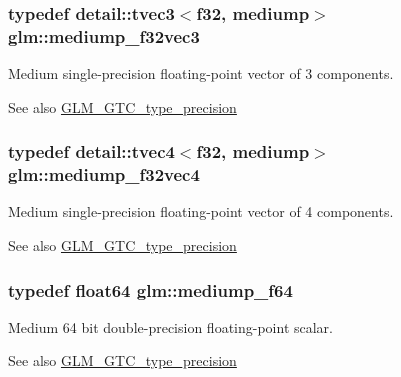 \subsubsection[{\texorpdfstring{mediump\+\_\+f32vec3}{mediump_f32vec3}}]{\setlength{\rightskip}{0pt plus 5cm}typedef detail\+::tvec3$<$f32, mediump$>$ {\bf glm\+::mediump\+\_\+f32vec3}}\hypertarget{group__gtc__type__precision_gada8879dd10f28428e2eb1ae62f643f65}{}\label{group__gtc__type__precision_gada8879dd10f28428e2eb1ae62f643f65}
Medium single-\/precision floating-\/point vector of 3 components. \begin{DoxySeeAlso}{See also}
\hyperlink{group__gtc__type__precision}{G\+L\+M\+\_\+\+G\+T\+C\+\_\+type\+\_\+precision} 
\end{DoxySeeAlso}
\subsubsection[{\texorpdfstring{mediump\+\_\+f32vec4}{mediump_f32vec4}}]{\setlength{\rightskip}{0pt plus 5cm}typedef detail\+::tvec4$<$f32, mediump$>$ {\bf glm\+::mediump\+\_\+f32vec4}}\hypertarget{group__gtc__type__precision_gaa5a1b058d185d87504591a11c6247518}{}\label{group__gtc__type__precision_gaa5a1b058d185d87504591a11c6247518}
Medium single-\/precision floating-\/point vector of 4 components. \begin{DoxySeeAlso}{See also}
\hyperlink{group__gtc__type__precision}{G\+L\+M\+\_\+\+G\+T\+C\+\_\+type\+\_\+precision} 
\end{DoxySeeAlso}
\subsubsection[{\texorpdfstring{mediump\+\_\+f64}{mediump_f64}}]{\setlength{\rightskip}{0pt plus 5cm}typedef float64 {\bf glm\+::mediump\+\_\+f64}}\hypertarget{group__gtc__type__precision_gabd273bd38ea5e013aeec9ffd2b2591fb}{}\label{group__gtc__type__precision_gabd273bd38ea5e013aeec9ffd2b2591fb}
Medium 64 bit double-\/precision floating-\/point scalar. \begin{DoxySeeAlso}{See also}
\hyperlink{group__gtc__type__precision}{G\+L\+M\+\_\+\+G\+T\+C\+\_\+type\+\_\+precision} 
\end{DoxySeeAlso}
